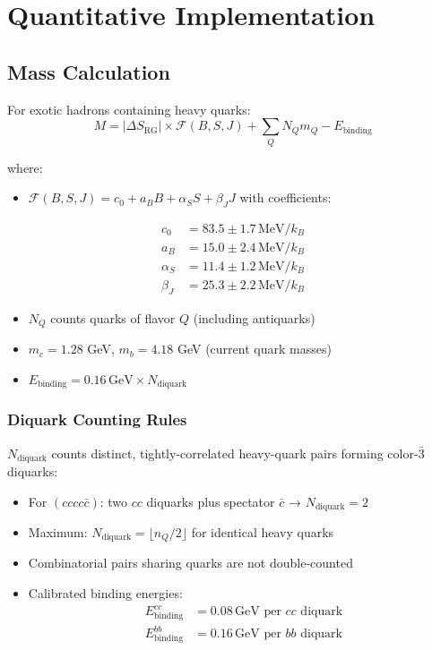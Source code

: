 \documentclass[12pt,a4paper]{article}
\begin{document}
\section{Quantitative Implementation}

\subsection{Mass Calculation}

For exotic hadrons containing heavy quarks:
\begin{equation}
M = |\Delta S_{\text{RG}}| \times \mathcal{F}(B,S,J) + \sum_Q N_Q m_Q - E_{\text{binding}}
\end{equation}

where:
\begin{itemize}
\item $\mathcal{F}(B,S,J) = c_0 + a_B B + \alpha_S S + \beta_J J$ with coefficients:
\end{itemize}

\begin{align}
c_0 &= 83.5 \pm 1.7\,\text{MeV}/k_B \\
a_B &= 15.0 \pm 2.4\,\text{MeV}/k_B \\
\alpha_S &= 11.4 \pm 1.2\,\text{MeV}/k_B \\
\beta_J &= 25.3 \pm 2.2\,\text{MeV}/k_B
\end{align}

\begin{itemize}
\item $N_Q$ counts quarks of flavor $Q$ (including antiquarks)
\item $m_c = 1.28$ GeV, $m_b = 4.18$ GeV (current quark masses)
\item $E_{\text{binding}} = 0.16\,\text{GeV} \times N_{\text{diquark}}$
\end{itemize}

\subsubsection{Diquark Counting Rules}

$N_{\text{diquark}}$ counts distinct, tightly-correlated heavy-quark pairs forming color-$\bar{3}$ diquarks:

\begin{itemize}
\item For $(cccc\bar{c})$: two $cc$ diquarks plus spectator $\bar{c}$ → $N_{\text{diquark}} = 2$
\item Maximum: $N_{\text{diquark}} = \lfloor n_Q/2 \rfloor$ for identical heavy quarks
\item Combinatorial pairs sharing quarks are not double-counted
\item Calibrated binding energies:
\begin{align}
E_{\text{binding}}^{cc} &= 0.08\,\text{GeV per }cc\text{ diquark} \\
E_{\text{binding}}^{bb} &= 0.16\,\text{GeV per }bb\text{ diquark}
\end{align}
\end{itemize}
\end{document}
